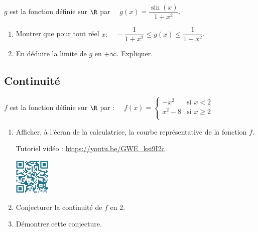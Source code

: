 \documentclass[a4paper,11pt,exos]{nsi} %
\begin{document}
\exo{}
$g$ est la fonction définie sur $\R$ par $\quad g(x)=\dfrac{\sin(x)}{1+x^2}$.
\begin{enumerate}
	\item Montrer que pour tout réel $x : \quad -\dfrac{1}{1+x^2}\leqslant g(x)\leqslant \dfrac{1}{1+x^2}$.
	\item En déduire la limite de $g$ en $+\infty$. Expliquer.
\end{enumerate}


\subsection*{Continuité}

\tabdefault

\exo{ \faCalculator}
$f$ est la fonction définie sur $\R$ par : $\quad f(x)=
\left\{
    \begin{array}{ll}
        -x^2 & \text{si } x<2 \\
        x^2-8 & \text{si } x\geqslant 2 \\
    \end{array}
\right. $
\begin{enumerate}
	\item Afficher, à l'écran de la calculatrice, la courbe représentative de la fonction $f$.\\
	\begin{minipage}{10cm}
		Tutoriel vidéo : \url{https://youtu.be/GWE_ksi9I2c}
	\end{minipage}
	\begin{minipage}{5cm}
		\includegraphics[width=1.7cm]{code-qr1.png}
	\end{minipage}
	\item Conjecturer la continuité de $f$ en 2.
	\item Démontrer cette conjecture.
\end{enumerate}
\end{document}
